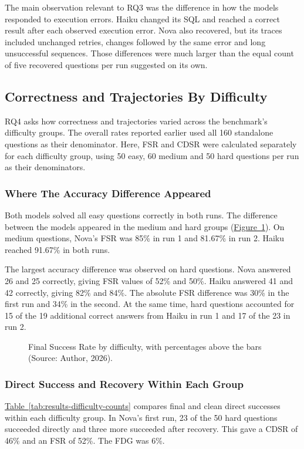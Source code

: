 The main observation relevant to RQ3 was the difference 
in how the models responded to execution errors.
Haiku changed its SQL and reached a correct result after each observed execution error. 
Nova also recovered, but its traces included unchanged retries,
changes followed by the same error and long unsuccessful sequences.
Those differences were much larger than the equal count of five recovered
questions per run suggested on its own.

\subsection{Correctness and Trajectories By Difficulty}
\label{sec:results-difficulty}

RQ4 asks how correctness and trajectories varied across the benchmark's
difficulty groups. 
The overall rates reported earlier used all 160 standalone questions as their denominator.
Here, FSR and CDSR were calculated separately for each difficulty group,
using 50 easy, 60 medium and 50 hard questions per run as their denominators.

\subsubsection{Where The Accuracy Difference Appeared}

Both models solved all easy questions correctly in both runs.
The difference between the models appeared in the medium and hard groups
(\hyperref[fig:results-difficulty]{Figure~\ref*{fig:results-difficulty}}).
On medium questions, Nova's FSR was 85\% in run 1 and
81.67\% in run 2. Haiku reached 91.67\% in both runs.

The largest accuracy difference was observed on hard questions.
Nova answered 26 and 25 correctly, giving FSR values of 52\% and 50\%. 
Haiku answered 41 and 42 correctly, giving 82\% and 84\%. 
The absolute FSR difference was 30\% in the first run and 34\% in the second. 
At the same time, hard questions accounted for 15 of the 19 additional correct answers 
from Haiku in run 1 and 17 of the 23 in run 2. 

\begin{figure}[H]
\centering

\caption{Final Success Rate by difficulty, with percentages above the bars (Source: Author, 2026).}
\label{fig:results-difficulty}
\end{figure}

\subsubsection{Direct Success and Recovery Within Each Group}
\hyperref[tab:results-difficulty-counts]{Table~\ref*{tab:results-difficulty-counts}}
compares final and clean direct successes within each difficulty group.
In Nova's first run, 23 of the 50 hard questions succeeded directly and three more
succeeded after recovery. This gave a CDSR of 46\% and an FSR of 52\%. 
The FDG was 6\%.

